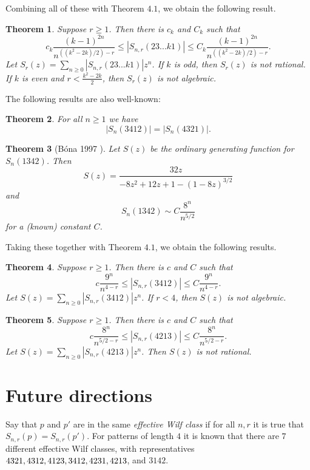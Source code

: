 \documentclass[11pt, final]{amsart}
\newtheorem{theorem}{Theorem}[section]								\newtheorem{proposition}[theorem]{Proposition}
\theoremstyle{remark}
\numberwithin{equation}{section}
\begin{document}
Combining all of these with Theorem $4.1$, we obtain the following result.
\begin{theorem}
    Suppose $r\geq 1$. Then there is $c_k$ and $C_k$ such that
    \[
    c_k \frac{(k-1)^{2n}}{n^{((k^2-2k)/2) - r}} \leq |S_{n,r}(23...k1)| \leq C_k \frac{(k-1)^{2n}}{n^{((k^2-2k)/2) - r}}.
    \]
    Let $S_r(z) = \sum_{n\geq 0} |S_{n,r}(23...k1)| z^n$. If $k$ is odd, then $S_r(z)$ is not rational. If $k$ is even and $r < \frac{k^2-2k}{2}$, then $S_r(z)$ is not algebraic.
\end{theorem}

The following results are also well-known:
\begin{theorem}
    For all $n\geq 1$ we have
    \[
    |S_n(3412)| = |S_n(4321)|.
    \]
\end{theorem}

\begin{theorem}[Bóna 1997 \cite{Bona1997b}]
    Let $S(z)$ be the ordinary generating function for $S_n(1342)$. Then
    \[
    S(z) = \frac{32z}{-8z^2 + 12z + 1 - (1-8z)^{3/2}}
    \]
    and
    \[
    S_n(1342) \sim C \frac{8^n}{n^{5/2}}
    \]
    for a (known) constant $C$.
\end{theorem}

Taking these together with Theorem $4.1$, we obtain the following results.

\begin{theorem}
    Suppose $r\geq 1$. Then there is $c$ and $C$ such that
    \[
    c \frac{9^{n}}{n^{4 - r}} \leq |S_{n,r}(3412)| \leq C \frac{9^{n}}{n^{4 - r}}.
    \]
    Let $S(z) = \sum_{n\geq 0} |S_{n,r}(3412)| z^n$. If $r < 4$, then $S(z)$ is not algebraic.
\end{theorem}

\begin{theorem}
    Suppose $r\geq 1$. Then there is $c$ and $C$ such that
    \[
    c \frac{8^{n}}{n^{5/2 - r}} \leq |S_{n,r}(4213)| \leq C \frac{8^{n}}{n^{5/2 - r}}.
    \]
    Let $S(z) = \sum_{n\geq 0} |S_{n,r}(4213)| z^n$. Then $S(z)$ is not rational.
\end{theorem}



\section{Future directions}

Say that $p$ and $p'$ are in the same \textit{effective Wilf class} if for all $n,r$ it is true that $S_{n,r}(p) = S_{n,r}(p')$. For patterns of length $4$ it is known that there are $7$ different effective Wilf classes, with representatives $4321, 4312, 4123, 3412, 4231, \\ 4213$, and $3142$.
\end{document}
